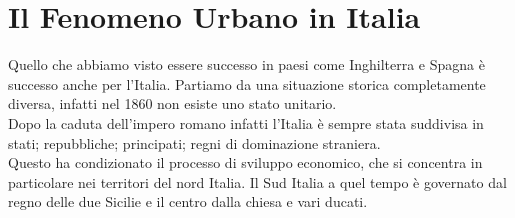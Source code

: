 \documentclass[a4paper,12pt, oneside]{book}
\begin{document}
  \chapter{Il Fenomeno Urbano in Italia}
   Quello che abbiamo visto essere successo in paesi come Inghilterra e Spagna è successo anche per l'Italia. Partiamo da una situazione storica completamente diversa, infatti nel 1860 non esiste uno stato unitario.\\
   Dopo la caduta dell'impero romano infatti l'Italia è sempre stata suddivisa in stati; repubbliche; principati; regni di dominazione straniera.\\
   Questo ha condizionato il processo di sviluppo economico, che si concentra in particolare nei territori del nord Italia. Il Sud Italia a quel tempo è governato dal regno delle due Sicilie e il centro dalla chiesa e vari ducati.\\
\end{document}
